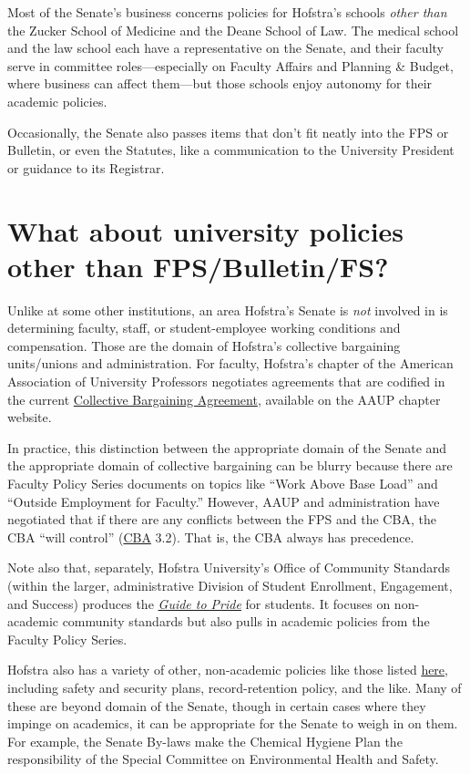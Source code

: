 \documentclass[12pt]{article}
\begin{document}
Most of the Senate's business concerns policies for Hofstra's schools
\emph{other than} the Zucker School of Medicine and the Deane School of
Law. The medical school and the law school each have a representative on
the Senate, and their faculty serve in committee roles---especially on
Faculty Affairs and Planning \& Budget, where business can affect
them---but those schools enjoy autonomy for their academic policies.

Occasionally, the Senate also passes items that don't fit neatly into
the FPS or Bulletin, or even the Statutes, like a communication to the
University President or guidance to its Registrar.

\section{What about university policies other than
FPS/Bulletin/FS?}\label{what-about-university-policies-other-than-fpsbulletinfs}

Unlike at some other institutions, an area Hofstra's Senate is
\emph{not} involved in is determining faculty, staff, or
student-employee working conditions and compensation. Those are the
domain of Hofstra's collective bargaining units/unions and
administration. For faculty, Hofstra's chapter of the American
Association of University Professors negotiates agreements that are
codified in the current \href{https://aaup-hofstra.org}{Collective
Bargaining Agreement}, available on the AAUP chapter website.

In practice, this distinction between the appropriate domain of the
Senate and the appropriate domain of collective bargaining can be blurry
because there are Faculty Policy Series documents on topics like ``Work
Above Base Load'' and ``Outside Employment for Faculty.'' However, AAUP
and administration have negotiated that if there are any conflicts
between the FPS and the CBA, the CBA ``will control''
(\href{https://aaup-hofstra.org}{CBA} 3.2). That is, the CBA always has
precedence.

Note also that, separately, Hofstra University's Office of Community
Standards (within the larger, administrative Division of Student
Enrollment, Engagement, and Success) produces the
\href{https://sites.google.com/hofstra.edu/guide-to-pride/home}{\emph{Guide
to Pride}} for students. It focuses on non-academic community standards
but also pulls in academic policies from the Faculty Policy Series.

Hofstra also has a variety of other, non-academic policies like those
listed \href{https://www.hofstra.edu/about/policies.html}{here},
including safety and security plans, record-retention policy, and the
like. Many of these are beyond domain of the Senate, though in certain
cases where they impinge on academics, it can be appropriate for the
Senate to weigh in on them. For example, the Senate By-laws make the
Chemical Hygiene Plan the responsibility of the Special Committee on
Environmental Health and Safety.
\end{document}
